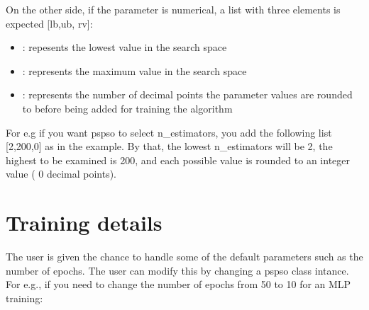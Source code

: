 \documentclass[letterpaper,10pt,english]{sphinxmanual}
\begin{document}

On the other side, if the parameter is numerical, a list with three elements is expected {[}lb,ub, rv{]}:
\begin{itemize}
\item {} 
: repesents the lowest value in the search space

\item {} 
: represents the maximum value in the search space

\item {} 
: represents the number of decimal points the parameter values are rounded to before being added for training the algorithm

\end{itemize}

For e.g if you want pspso to select n\_estimators, you add the following list {[}2,200,0{]} as in the example.
By that, the lowest n\_estimators will be 2, the highest to be examined is 200, and each possible value is rounded to an integer value ( 0 decimal points).


\section{Training details}
\label{\detokenize{index:training-details}}
The user is given the chance to handle some of the default parameters
such as the number of epochs. The user can modify this by changing a
pspso class intance. For e.g., if you need to change the number of
epochs from 50 to 10 for an MLP training:

\begin{sphinxVerbatim}[commandchars=\\\{\}]
   
\PYG{p}{[}\PYG{p}{]}
\end{sphinxVerbatim}
\end{document}
